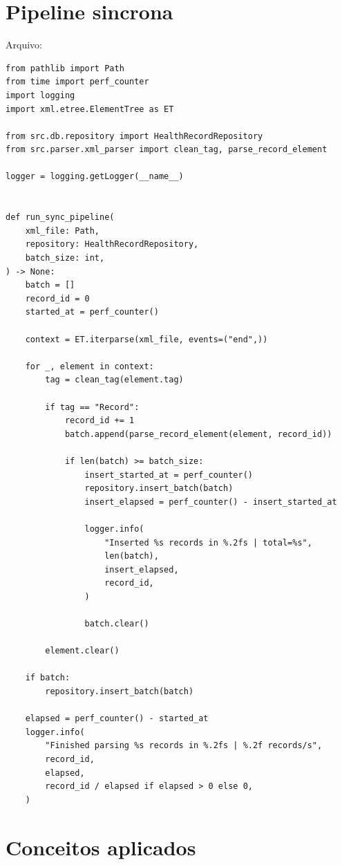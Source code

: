 \section{Pipeline sincrona}

Arquivo: 

\begin{lstlisting}[style=devbutterpython]
from pathlib import Path
from time import perf_counter
import logging
import xml.etree.ElementTree as ET

from src.db.repository import HealthRecordRepository
from src.parser.xml_parser import clean_tag, parse_record_element

logger = logging.getLogger(__name__)


def run_sync_pipeline(
    xml_file: Path,
    repository: HealthRecordRepository,
    batch_size: int,
) -> None:
    batch = []
    record_id = 0
    started_at = perf_counter()

    context = ET.iterparse(xml_file, events=("end",))

    for _, element in context:
        tag = clean_tag(element.tag)

        if tag == "Record":
            record_id += 1
            batch.append(parse_record_element(element, record_id))

            if len(batch) >= batch_size:
                insert_started_at = perf_counter()
                repository.insert_batch(batch)
                insert_elapsed = perf_counter() - insert_started_at

                logger.info(
                    "Inserted %s records in %.2fs | total=%s",
                    len(batch),
                    insert_elapsed,
                    record_id,
                )

                batch.clear()

        element.clear()

    if batch:
        repository.insert_batch(batch)

    elapsed = perf_counter() - started_at
    logger.info(
        "Finished parsing %s records in %.2fs | %.2f records/s",
        record_id,
        elapsed,
        record_id / elapsed if elapsed > 0 else 0,
    )
\end{lstlisting}

\section{Conceitos aplicados}

